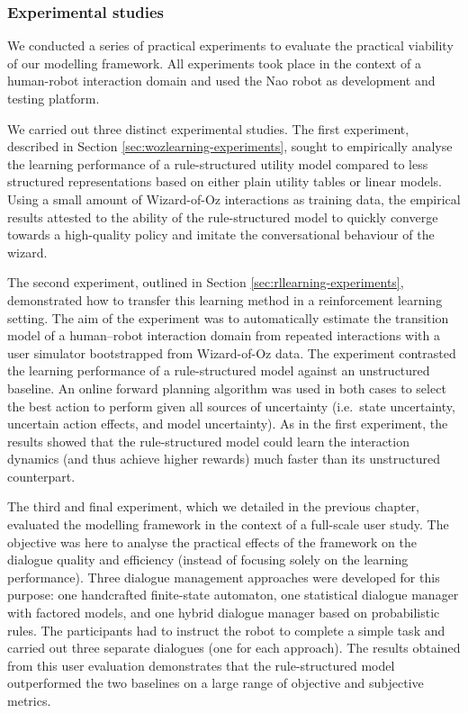\subsubsection*{Experimental studies}

We conducted a series of practical experiments to evaluate the practical viability of our modelling framework. All experiments took place in the context of a human-robot interaction domain and used the Nao robot as development and testing platform. 

We carried out three distinct experimental studies.  The first experiment, described in Section \ref{sec:wozlearning-experiments}, sought to empirically analyse the learning performance of a rule-structured utility model compared to less structured representations based on either plain utility tables or linear models.  Using a small amount of Wizard-of-Oz interactions as training data, the empirical results attested to the ability of the rule-structured model to quickly converge towards a high-quality policy and imitate the conversational behaviour of the wizard.

The second experiment, outlined in Section \ref{sec:rllearning-experiments}, demonstrated how to transfer this learning method in a reinforcement learning setting.  The aim of the experiment was to automatically estimate the transition model of a human--robot interaction domain from repeated interactions with a user simulator bootstrapped from Wizard-of-Oz data. The experiment contrasted the learning performance of a rule-structured model against an unstructured baseline.  An online forward planning algorithm was used in both cases to select the best action to perform given all sources of uncertainty (i.e.\ state uncertainty, uncertain action effects, and model uncertainty). As in the first experiment, the results showed that the rule-structured model could learn the interaction dynamics (and thus achieve higher rewards) much faster than its unstructured counterpart.

The third and final experiment, which we detailed in the previous chapter, evaluated the modelling framework in the context of a full-scale user study.  The objective was here to analyse the practical effects of the framework on the dialogue quality and efficiency (instead of focusing solely on the learning performance). Three dialogue management approaches were developed for this purpose: one handcrafted finite-state automaton, one statistical dialogue manager with factored models, and one hybrid dialogue manager based on probabilistic rules.  The participants had to instruct the robot to complete a simple task and carried out three separate dialogues (one for each approach).  The results obtained from this user evaluation demonstrates that the rule-structured model outperformed the two baselines on a large range of objective and subjective metrics.


